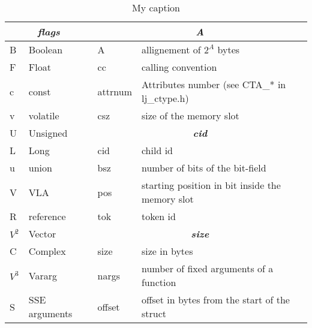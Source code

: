 \begin{table}[p]
\footnotesize
\centering
\caption{My caption}
\label{tab:ffi-ctype2}
\begin{tabular}{ll|l|l|}
\hline
\multicolumn{2}{|c|}{\textit{\textbf{flags}}} & \multicolumn{2}{c|}{\textit{\textbf{A}}}                                    \\ \hline
\multicolumn{1}{|l|}{B}      & Boolean        & A                      & allignement of $2^A$ bytes                         \\
\multicolumn{1}{|l|}{F}      & Float          & cc                     & calling convention                                 \\
\multicolumn{1}{|l|}{c}      & const          & attrnum                & Attributes number (see CTA\_* in lj\_ctype.h)      \\
\multicolumn{1}{|l|}{v}      & volatile       & csz                    & size of the memory slot                            \\ \cline{3-4}
\multicolumn{1}{|l|}{U}      & Unsigned       & \multicolumn{2}{c|}{\textit{\textbf{cid}}}                                  \\ \cline{3-4}
\multicolumn{1}{|l|}{L}      & Long           & cid                    & child id                                           \\
\multicolumn{1}{|l|}{u}      & union          & bsz                    & number of bits of the bit-field                    \\
\multicolumn{1}{|l|}{V}      & VLA            & pos                    & starting position in bit inside the memory slot    \\
\multicolumn{1}{|l|}{R}      & reference      & tok                    & token id                                           \\ \cline{3-4}
\multicolumn{1}{|l|}{$V^2$}  & Vector         & \multicolumn{2}{c|}{\textit{\textbf{size}}}                                 \\ \cline{3-4}
\multicolumn{1}{|l|}{C}      & Complex        & size                   & size in bytes                                      \\
\multicolumn{1}{|l|}{$V^3$}  & Vararg         & nargs                  & number of fixed arguments of a function            \\
\multicolumn{1}{|l|}{S}      & SSE arguments  & offset                 & offset in bytes from the start of the struct       \\ \cline{1-2}

\end{tabular}
\end{table}
